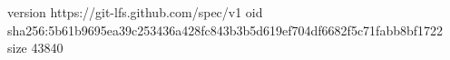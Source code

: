 version https://git-lfs.github.com/spec/v1
oid sha256:5b61b9695ea39c253436a428fc843b3b5d619ef704df6682f5c71fabb8bf1722
size 43840
